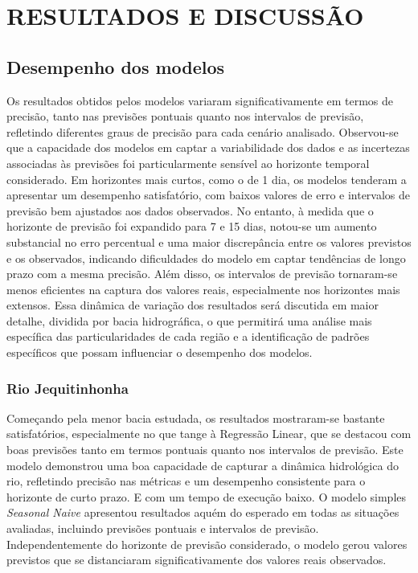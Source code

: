 \chapter{RESULTADOS E DISCUSS\~AO}
\label{cap:capitulo4}

\section{Desempenho dos modelos}

Os resultados obtidos pelos modelos variaram significativamente em termos de precisão, tanto nas previsões pontuais quanto nos intervalos de previsão, refletindo diferentes graus de precisão para cada cenário analisado. Observou-se que a capacidade dos modelos em captar a variabilidade dos dados e as incertezas associadas às previsões foi particularmente sensível ao horizonte temporal considerado. Em horizontes mais curtos, como o de 1 dia, os modelos tenderam a apresentar um desempenho satisfatório, com baixos valores de erro e intervalos de previsão bem ajustados aos dados observados. No entanto, à medida que o horizonte de previsão foi expandido para 7 e 15 dias, notou-se um aumento substancial no erro percentual e uma maior discrepância entre os valores previstos e os observados, indicando dificuldades do modelo em captar tendências de longo prazo com a mesma precisão. Além disso, os intervalos de previsão tornaram-se menos eficientes na captura dos valores reais, especialmente nos horizontes mais extensos. Essa dinâmica de variação dos resultados será discutida em maior detalhe, dividida por bacia hidrográfica, o que permitirá uma análise mais específica das particularidades de cada região e a identificação de padrões específicos que possam influenciar o desempenho dos modelos.

\subsection{Rio Jequitinhonha}

Começando pela menor bacia estudada, os resultados mostraram-se bastante satisfatórios, especialmente no que tange à Regressão Linear, que se destacou com boas previsões tanto em termos pontuais quanto nos intervalos de previsão. Este modelo demonstrou uma boa capacidade de capturar a dinâmica hidrológica do rio, refletindo precisão nas métricas e um desempenho consistente para o horizonte de curto prazo. E com um tempo de execução baixo. O modelo simples \textit{Seasonal Naive} apresentou resultados aquém do esperado em todas as situações avaliadas, incluindo previsões pontuais e intervalos de previsão. Independentemente do horizonte de previsão considerado, o modelo gerou valores previstos que se distanciaram significativamente dos valores reais observados.


